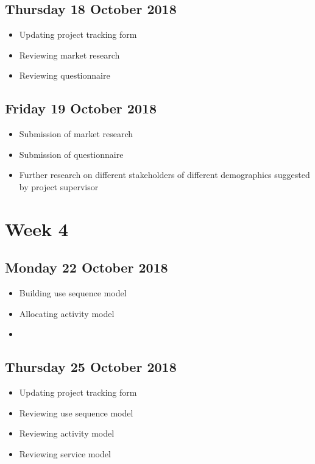 \subsection*{Thursday 18 October 2018}
\begin{itemize}
	\item Updating project tracking form
	\item Reviewing market research
	\item Reviewing questionnaire
\end{itemize}

\subsection*{Friday 19 October 2018}
\begin{itemize}
	\item Submission of market research
	\item Submission of questionnaire
	\item Further research on different stakeholders of different demographics suggested by project supervisor
\end{itemize}

\section*{Week 4}
\subsection*{Monday 22 October 2018}
\begin{itemize}
	\item Building use sequence model
	\item Allocating activity model
	\item 

\end{itemize}

\subsection*{Thursday 25 October 2018}
\begin{itemize}
	\item Updating project tracking form
	\item Reviewing use sequence model
	\item Reviewing activity model
	\item Reviewing service model 
\end{itemize}

